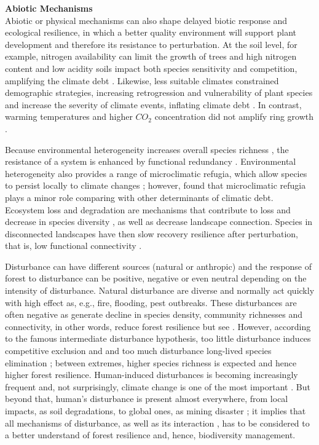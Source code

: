 \textbf{Abiotic Mechanisms}\\
Abiotic or physical mechanisms can also shape delayed biotic response and ecological resilience, in which a better quality environment will support plant development and therefore its resistance to perturbation.
At the soil level, for example, nitrogen availability can limit the growth of trees \parencite{Sullivan2013} and high nitrogen content and low acidity soils impact both species sensitivity and competition, amplifying the climate debt \parencite{Bertrand2016}.
Likewise, less suitable climates constrained demographic strategies, increasing retrogression and vulnerability of plant species \parencite{Csergo2017} and increase the severity of climate events, inflating climate debt \parencite{Bertrand2016}.
In contrast, warming temperatures and higher $CO_2$ concentration did not amplify ring growth \parencite{Girardin2017}.

Because environmental heterogeneity increases overall species richness \parencite{Stein2014}, the resistance of a system is enhanced by functional redundancy \parencite{Oliver2015}.
Environmental heterogeneity also provides a range of microclimatic refugia, which allow species to persist locally to climate changes \parencite{Maclean2015}; however, \textcite{Bertrand2016} found that microclimatic refugia plays a minor role comparing with other determinants of climatic debt.
Ecosystem loss and degradation are mechanisms that contribute to loss and decrease in species diversity \parencite{Essl2015}, as well as decrease landscape connection.
Species in disconnected landscapes have then slow recovery resilience after perturbation, that is, low functional connectivity \parencite{Oliver2015}.

Disturbance can have different sources (natural or anthropic) and the response of forest to disturbance can be positive, negative or even neutral depending on the intensity of disturbance.
Natural disturbance are diverse and normally act quickly with high effect as, e.g., fire, flooding, pest outbreaks.
These disturbances are often negative as generate decline in species density, community richnesses and connectivity, in other words, reduce forest resilience \parencite{Buma2011,Essl2015} but see \textcite{Bertrand2016}.
However, according to the famous intermediate disturbance hypothesis, too little disturbance induces competitive exclusion and and too much disturbance long-lived species elimination \parencite{Grime1973,Horn1975,Connell1978}; between extremes, higher species richness is expected and hence higher forest resilience.
Human-induced disturbances is becoming increasingly frequent and, not surprisingly, climate change is one of the most important \parencite{Bellard2012}.
But beyond that, human's disturbance is present almost everywhere, from local impacts, as soil degradations, to global ones, as mining disaster \parencite{Garcia2017}; it implies that all mechanisms of disturbance, as well as its interaction \parencite{Goring2017}, has to be considered to a better understand of forest resilience and, hence, biodiversity management.

